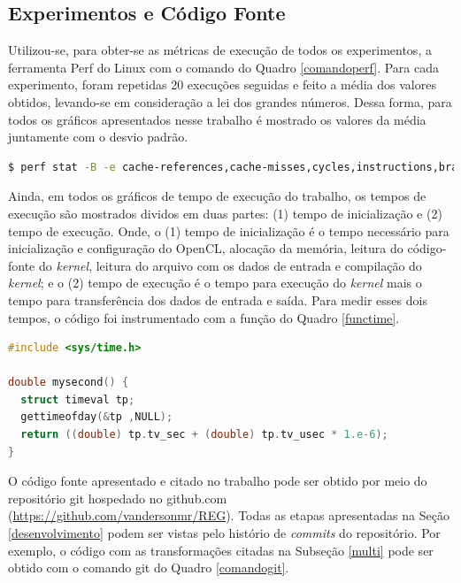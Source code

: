 \documentclass[12pt]{article}
\begin{document}


\subsection{Experimentos  e Código Fonte}

Utilizou-se, para obter-se as métricas de execução de todos os experimentos, a ferramenta Perf do Linux com o comando do Quadro \ref{comandoperf}. Para cada experimento, foram repetidas 20 execuções seguidas e feito a média dos valores obtidos, levando-se em consideração a lei dos grandes números. Dessa forma, para todos os gráficos apresentados nesse trabalho é mostrado os valores da média juntamente com o desvio padrão. \\ %

\begin{lstlisting}[language=bash, caption=Comando para mensurar as métricas de execução., label=comandoperf]
$ perf stat -B -e cache-references,cache-misses,cycles,instructions,branches,branch-misses,faults,migrations
\end{lstlisting}

Ainda, em todos os gráficos de tempo de execução do trabalho, os tempos de execução são mostrados dividos em duas partes: (1) tempo de inicialização e (2) tempo de execução. Onde, o (1) tempo de inicialização é o tempo necessário para inicialização e configuração do OpenCL, alocação da memória, leitura do código-fonte do \textit{kernel}, leitura do arquivo com os dados de entrada e compilação do \textit{kernel}; e o (2) tempo de execução é o tempo para execução do \textit{kernel} mais o tempo para transferência dos dados de entrada e saída. Para medir esses dois tempos, o código foi instrumentado com a função do Quadro \ref{functime}. \\

\begin{lstlisting}[language=c, caption=Função utilizada para calcular o tempo de execução de trexos de código, label=functime]
#include <sys/time.h>

double mysecond() {
  struct timeval tp;
  gettimeofday(&tp ,NULL);
  return ((double) tp.tv_sec + (double) tp.tv_usec * 1.e-6);
}
\end{lstlisting}

O código fonte apresentado e citado no trabalho pode ser obtido por meio do repositório git hospedado no github.com (\url{https://github.com/vandersonmr/REG}). Todas as etapas apresentadas na Seção \ref{desenvolvimento} podem ser vistas pelo histório de \textit{commits} do repositório. Por exemplo, o código com as transformações citadas na Subseção \ref{multi} pode ser obtido com o comando git do Quadro \ref{comandogit}. \\
\end{document}
